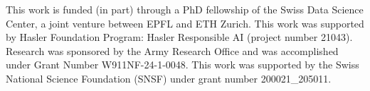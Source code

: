 \documentclass[11pt]{article}
\begin{document}
This work is funded (in part) through a PhD fellowship of the Swiss Data Science Center, a joint venture between EPFL and ETH Zurich. This work was supported by Hasler Foundation Program: Hasler Responsible AI (project number 21043). Research was sponsored by the Army Research Office and was accomplished under Grant Number W911NF-24-1-0048. This work was supported by the Swiss National Science Foundation (SNSF) under grant number 200021\_205011.





\newpage

\appendix








\end{document}
